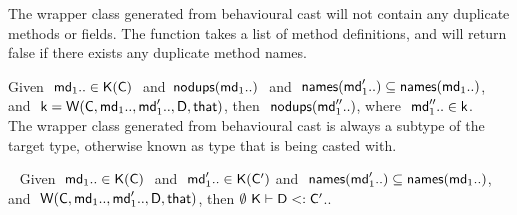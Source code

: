 \documentclass[acmlarge, anonymous, authordraft, review]{acmart} %
\begin{document}
% 
% 
   
\noindent
The wrapper class generated from behavioural cast will not contain
any duplicate methods or fields. The  function takes a 
list of method definitions, and will return false if there exists 
any duplicate method names.


\medskip{} Given $~\md[1].. \In \App\K\C~$ $ $and$~$ $\cload{\md[1]..}~$ 
and $~\names{\mdp[1]..} \subseteq \names{\md[1]..}$,
and $~\k = \wrapE{\C,\md[1].., \mdp[1]..,\D,\that}$, then $~\cload{\mdpp[1]..}$, where $~\mdpp[1].. \In \k$. \\

% 

\noindent
The wrapper class generated from behavioural cast is always a subtype
of the target type, otherwise known as type that is being casted with.


\medskip{} ~ Given $~\md[1]..\In\App\K\C~$ $ $and$ $ $~\mdp[1].. \In \App\K\Cp$ and 
$~\names{\mdp[1]..} \subseteq \names{\md[1]..}$, and $~\wrap\C{\md[1]..}{\mdp[1]..}\D\that $, 
then $\StrSub\emptyset\K\D\Cp$..\\
\end{document}

